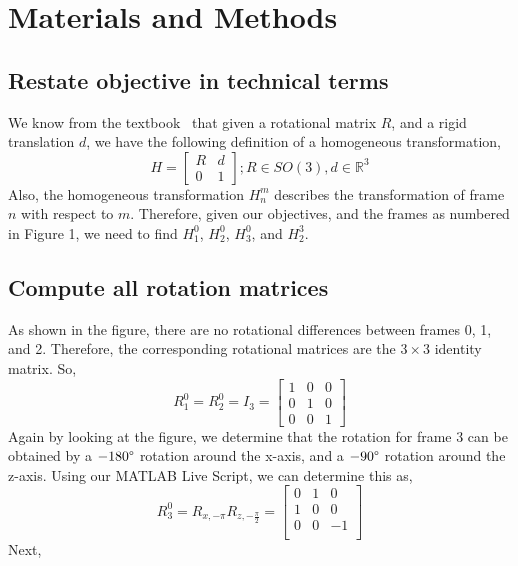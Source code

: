 \documentclass[conference]{IEEEtran}
\begin{document}
\section{Materials and Methods}

\subsection{Restate objective in technical terms}

We know from the textbook~\cite{Spong2006} that given a rotational matrix $R$, and
a rigid translation $d$, we have the following definition of
a homogeneous transformation,
\[
    H = \begin{bmatrix}
        R & d\\
        0 & 1
    \end{bmatrix}; R \in SO(3), d \in \mathbb{R}^3
\]
Also, the homogeneous transformation $H^m_n$ describes the transformation
of frame $n$ with respect to $m$.
Therefore, given our objectives, and the frames as numbered in Figure 1, 
we need to find $H^0_1$, $H^0_2$, $H^0_3$, and $H^3_2$.\\

\subsection{Compute all rotation matrices}
As shown in the figure, there are no rotational differences between frames
0, 1, and 2. Therefore, the corresponding rotational matrices are the
$3 \times 3$ identity matrix. So,
\[
    R^0_1 = R^0_2 = I_3 = \begin{bmatrix}
        1 & 0 & 0\\
        0 & 1 & 0\\
        0 & 0 & 1
    \end{bmatrix}
\]
Again by looking at the figure, we determine that the rotation for frame 3
can be obtained by a $-180\degree$ rotation around the x-axis, and a
$-90\degree$ rotation around the z-axis. Using our MATLAB Live Script,
we can determine this as,
\[
    R^0_3 = R_{x,-\pi} R_{z,-\frac{\pi}{2}} = \begin{bmatrix}
        0 & 1 & 0\\
        1 & 0 & 0\\
        0 & 0 & -1\\
    \end{bmatrix}
\]
Next,



\end{document}

